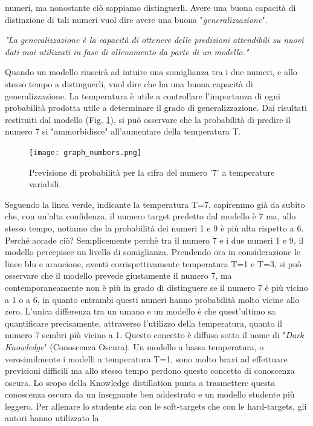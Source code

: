 numeri, ma nonostante ciò sappiamo distinguerli. Avere una buona capacità 
di distinzione di tali numeri vuol dire avere una buona "\emph{generalizzazione}". 
\begin{displayquote}
    \emph{"La generalizzazione è la capacità di ottenere delle predizioni 
    attendibili su nuovi dati mai utilizzati in fase di allenamento 
    da parte di un modello."}
\end{displayquote}
Quando un modello riuscirà ad intuire una somiglianza tra i due numeri, 
e allo stesso tempo a distinguerli, vuol dire che ha una buona capacità di 
generalizzazione. La temperatura è utile a controllare l'importanza di ogni 
probabilità prodotta utile a determinare il grado di generalizzazione. Dai 
risultati restituiti dal modello (Fig. \ref{7_1}), si può osservare che la probabilità 
di predire il numero 7 si "ammorbidisce" all'aumentare della temperatura T.
\begin{figure}
    \centering
    \texttt{[image: graph\_numbers.png]}
    \centering
    \caption{Previsione di probabilità per la cifra del numero '7' a temperature variabili.}
    \label{7_1}
\end{figure}
Seguendo la linea verde, indicante la temperatura T=7, capiremmo già da 
subito che, con un'alta confidenza, il numero target predetto dal modello è 7 
ma, allo stesso tempo, notiamo che la probabilità dei numeri 1 e 9 è più alta 
rispetto a 6. Perché accade ciò? Semplicemente perchè tra il numero 7 e i 
due numeri 1 e 9, il modello percepisce un livello di somiglianza. Prendendo 
ora in considerazione le linee blu e arancione, aventi corrispettivamente 
temperatura T=1 e T=3, si può osservare che il modello prevede giustamente 
il numero 7, ma contemporaneamente non è più in grado di distinguere se il 
numero 7 è più vicino a 1 o a 6, in quanto entrambi questi numeri hanno 
probabilità molto vicine allo zero. L'unica differenza tra un umano e un 
modello è che quest'ultimo sa quantificare precisamente, attraverso l'utilizzo 
della temperatura, quanto il numero 7 sembri più vicino a 1. Questo concetto 
è diffuso sotto il nome di "\emph{Dark Knowledge}" (Conoscenza Oscura). Un 
modello a bassa temperatura, o verosimilmente i modelli a temperatura 
T=1, sono molto bravi ad effettuare previsioni difficili ma allo stesso tempo 
perdono questo concetto di conoscenza oscura. Lo scopo della Knowledge 
distillation punta a trasmettere questa conoscenza oscura da un insegnante 
ben addestrato e un modello studente più leggero. Per allenare lo studente 
sia con le soft-targets che con le hard-targets, gli autori hanno utilizzato la 
